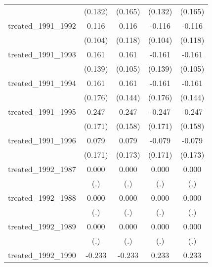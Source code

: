 {\begin{tabular}{l*{4}{c}}
            &     (0.132)         &     (0.165)         &     (0.132)         &     (0.165)         \\
[1em]
treated\_1991\_1992&       0.116         &       0.116         &      -0.116         &      -0.116         \\
            &     (0.104)         &     (0.118)         &     (0.104)         &     (0.118)         \\
[1em]
treated\_1991\_1993&       0.161         &       0.161         &      -0.161         &      -0.161         \\
            &     (0.139)         &     (0.105)         &     (0.139)         &     (0.105)         \\
[1em]
treated\_1991\_1994&       0.161         &       0.161         &      -0.161         &      -0.161         \\
            &     (0.176)         &     (0.144)         &     (0.176)         &     (0.144)         \\
[1em]
treated\_1991\_1995&       0.247         &       0.247         &      -0.247         &      -0.247         \\
            &     (0.171)         &     (0.158)         &     (0.171)         &     (0.158)         \\
[1em]
treated\_1991\_1996&       0.079         &       0.079         &      -0.079         &      -0.079         \\
            &     (0.171)         &     (0.173)         &     (0.171)         &     (0.173)         \\
[1em]
treated\_1992\_1987&       0.000         &       0.000         &       0.000         &       0.000         \\
            &         (.)         &         (.)         &         (.)         &         (.)         \\
[1em]
treated\_1992\_1988&       0.000         &       0.000         &       0.000         &       0.000         \\
            &         (.)         &         (.)         &         (.)         &         (.)         \\
[1em]
treated\_1992\_1989&       0.000         &       0.000         &       0.000         &       0.000         \\
            &         (.)         &         (.)         &         (.)         &         (.)         \\
[1em]
treated\_1992\_1990&      -0.233         &      -0.233         &       0.233         &       0.233         \\

\end{tabular}}

